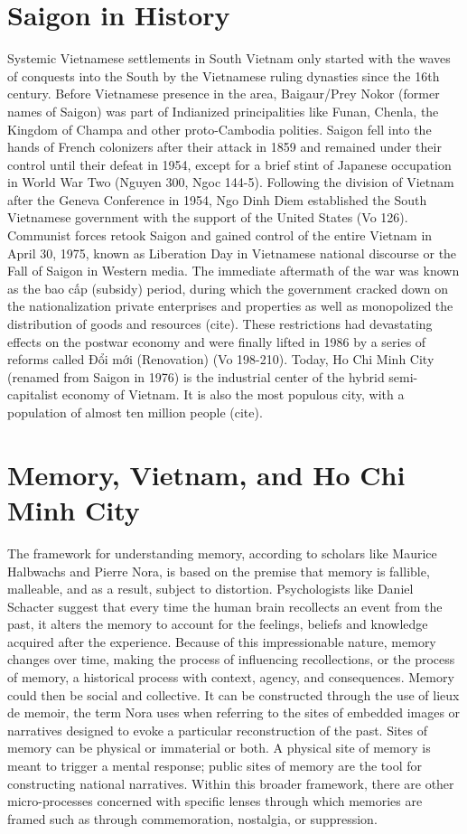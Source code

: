 \section{Saigon in History}
Systemic Vietnamese settlements in South Vietnam only started with the waves of conquests into the South by the Vietnamese ruling dynasties since the 16th century. Before Vietnamese presence in the area, Baigaur/Prey Nokor (former names of Saigon) was part of Indianized principalities like Funan, Chenla, the Kingdom of Champa and other proto-Cambodia polities. Saigon fell into the hands of French colonizers after their attack in 1859 and remained under their control until their defeat in 1954, except for a brief stint of Japanese occupation in World War Two (Nguyen 300, Ngoc 144-5). Following the division of Vietnam after the Geneva Conference in 1954, Ngo Dinh Diem established the South Vietnamese government with the support of the United States (Vo 126). Communist forces retook Saigon and gained control of the entire Vietnam in April 30, 1975, known as Liberation Day in Vietnamese national discourse or the Fall of Saigon in Western media. The immediate aftermath of the war was known as the bao cấp (subsidy) period, during which the government cracked down on the nationalization private enterprises and properties as well as monopolized the distribution of goods and resources (cite). These restrictions had devastating effects on the postwar economy and were finally lifted in 1986 by a series of reforms called Đổi mới (Renovation) (Vo 198-210). Today, Ho Chi Minh City (renamed from Saigon in 1976) is the industrial center of the hybrid semi-capitalist economy of Vietnam. It is also the most populous city, with a population of almost ten million people (cite). 

\section{Memory, Vietnam, and Ho Chi Minh City}
The framework for understanding memory, according to scholars like Maurice Halbwachs and Pierre Nora, is based on the premise that memory is fallible, malleable, and as a result, subject to distortion.  Psychologists like Daniel Schacter suggest that every time the human brain recollects an event from the past, it alters the memory to account for the feelings, beliefs and knowledge acquired after the experience.  Because of this impressionable nature, memory changes over time, making the process of influencing recollections, or the process of memory, a historical process with context, agency, and consequences. Memory could then be social and collective.  It can be constructed through the use of lieux de memoir, the term Nora uses when referring to the sites of embedded images or narratives designed to evoke a particular reconstruction of the past.  Sites of memory can be physical or immaterial or both. A physical site of memory is meant to trigger a mental response; public sites of memory are the tool for constructing national narratives.  Within this broader framework, there are other micro-processes concerned with specific lenses through which memories are framed such as through commemoration, nostalgia, or suppression. 

